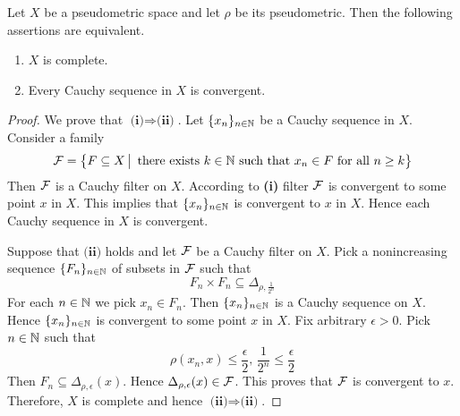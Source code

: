 \documentclass[10pt]{amsart}
\begin{document}
\begin{theorem}\label{theorem:completeness_for_pseudometric_spaces_is_equivalent_to_convergence_of_Cauchy_sequences}
	Let $X$ be a pseudometric space and let $\rho$ be its pseudometric. Then the following assertions are equivalent.
	\begin{enumerate}[label=\emph{\textbf{(\roman*)}}, leftmargin=3.0em]
		\item $X$ is complete.
		\item Every Cauchy sequence in $X$ is convergent.
	\end{enumerate}
\end{theorem}
\begin{proof}
	We prove that $\textbf{(i)} \Rightarrow \textbf{(ii)}$. Let $\{x_n\}_{n \in {\mathbb N}}$ be a Cauchy sequence in $X$. Consider a family
	$${\mathcal F} = \big\{F\subseteq X\,\big|\,\mbox{ there exists }k\in {\mathbb N}\mbox{ such that }x_n \in F\mbox{ for all }n\geq k\big\}$$
	Then ${\mathcal F}$ is a Cauchy filter on $X$. According to \textbf{(i)} filter ${\mathcal F}$ is convergent to some point $x$ in $X$. This implies that $\{x_n\}_{n \in {\mathbb N}}$ is convergent to $x$ in $X$. Hence each Cauchy sequence in $X$ is convergent.

	Suppose that $\textbf{(ii)}$ holds and let ${\mathcal F}$ be a Cauchy filter on $X$. Pick a nonincreasing sequence $\{F_n\}_{n\in {\mathbb N}}$ of subsets in ${\mathcal F}$ such that
	$$F_n \times F_n \subseteq \Delta_{\rho, \frac{1}{2^n}}$$
	For each $n \in {\mathbb N}$ we pick $x_n \in F_n$. Then $\{x_n\}_{n \in {\mathbb N}}$ is a Cauchy sequence on $X$. Hence $\{x_n\}_{n \in {\mathbb N}}$ is convergent to some point $x$ in $X$. Fix arbitrary $\epsilon > 0$. Pick $n \in {\mathbb N}$ such that
	$$\rho(x_n,x) \leq \frac{\epsilon}{2},\,\frac{1}{2^n} \leq \frac{\epsilon}{2}$$
	Then $F_n \subseteq \Delta_{\rho, \epsilon}(x)$. Hence $\Delta_{\rho, \epsilon}(x) \in {\mathcal F}$. This proves that ${\mathcal F}$ is convergent to $x$. Therefore, $X$ is complete and hence $\textbf{(ii)}\Rightarrow \textbf{(ii)}$.
\end{proof}
\end{document}
